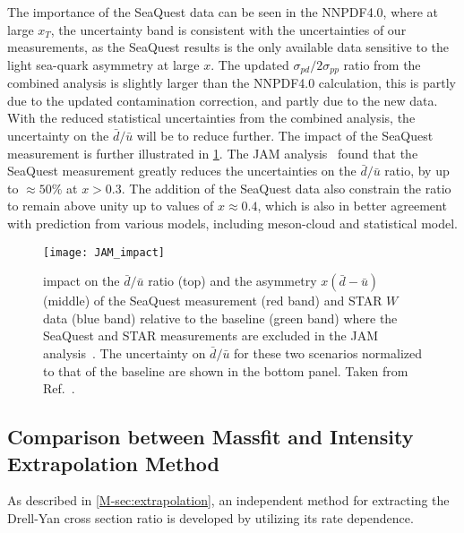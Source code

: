 \documentclass[../main.tex]{subfiles}
\begin{document}
The importance of the SeaQuest data can be seen in the NNPDF4.0, where at large $x_T$, the
uncertainty band is consistent with the uncertainties of our measurements, as the SeaQuest
results is the only available data sensitive to the light sea-quark asymmetry at large $x$.
The updated $\sigma_{pd}/2\sigma_{pp}$ ratio from the combined analysis is slightly larger than the NNPDF4.0
calculation, this is partly due to the updated contamination correction, and partly due to the new data.
With the reduced statistical uncertainties from the combined analysis,
the uncertainty on the $\bar{d}/\bar{u}$ will be to reduce further.
The impact of the SeaQuest measurement is further illustrated in \cref{fig:JAM_impact}. 
The JAM analysis~\cite{cocuzza2021} found that the SeaQuest measurement greatly reduces the 
uncertainties on the $\bar{d}/\bar{u}$ ratio, by up to $\approx 50\%$ at $x>0.3$. 
The addition of the SeaQuest data also constrain the ratio to remain above unity up to values of $x\approx0.4$,
which is also in better agreement with prediction from various models, including meson-cloud and statistical model.
\begin{figure}[h!]
	\centering
	\texttt{[image: JAM\_impact]}
	\caption{impact on the $\bar{d}/\bar{u}$ ratio (top) and the asymmetry $x\left(\bar{d}-\bar{u}\right)$ (middle)
		of the SeaQuest measurement (red band) and STAR $W$ data \cite{adam2021} (blue band) relative to the baseline (green band) 
		where the SeaQuest and STAR measurements are excluded in the JAM analysis~\cite{cocuzza2021}.
		The uncertainty on $\bar{d}/\bar{u}$ for these two scenarios normalized to that of the baseline
		are shown in the bottom panel. Taken from Ref.~\cite{cocuzza2021}.}
	\label{fig:JAM_impact}
\end{figure}

\subsection{Comparison between Massfit and Intensity Extrapolation Method}
As described in \cref{M-sec:extrapolation}, an independent method for extracting the Drell-Yan cross section
ratio is developed by utilizing its rate dependence. 
\end{document}
